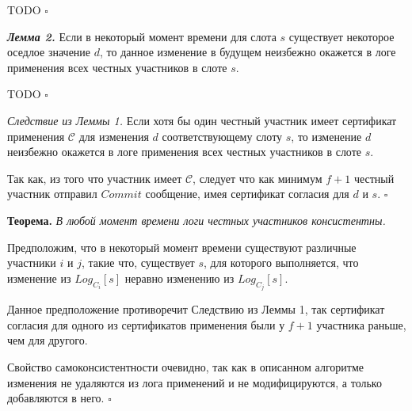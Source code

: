 TODO $\square$

\textbf{\textit{Лемма 2.}} Если в некоторый момент времени для слота $s$ существует некоторое оседлое значение $d$, то данное изменение в будущем неизбежно окажется в логе применения всех честных участников в слоте $s$.

TODO $\square$

\vspace{10pt}

\textit{Следствие из Леммы 1.} Если хотя бы один честный участник имеет сертификат применения $\mathcal{C}$ для изменения $d$ соответствующему слоту $s$, то  изменение $d$ неизбежно окажется в логе применения всех честных участников в слоте $s$. 

Так как, из того что участник имеет $\mathcal{C}$, следует что как минимум $f+1$ честный участник отправил $Commit$ сообщение, имея сертификат согласия для $d$ и $s$. $\square$
\vspace{10pt}

\textbf{Теорема.} \textit{В любой момент времени логи честных участников консистентны.}

Предположим, что в некоторый момент времени существуют различные участники $i$ и $j$, такие что, существует $s$, для которого выполняется, что изменение из $Log_{C_i}[s]$ неравно изменению из $Log_{C_j}[s]$.

Данное предположение противоречит Следствию из Леммы 1, так сертификат согласия для одного из сертификатов применения были у $f+1$ участника раньше, чем для другого.

Свойство самоконсистентности очевидно, так как в описанном алгоритме изменения не удаляются из лога применений и не модифицируются, а только добавляются в него. $\square$
